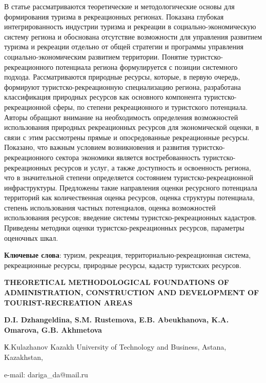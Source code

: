 В статье рассматриваются теоретические и методологические основы для
формирования туризма в рекреационных регионах. Показана глубокая
интегрированность индустрии туризма и рекреации в
социально-экономическую систему региона и обоснована отсутствие
возможности для управления развитием туризма и рекреации отдельно от
общей стратегии и программы управления социально-экономическим развитием
территории. Понятие туристско-рекреационного потенциала региона
формулируется с позиции системного подхода. Рассматриваются природные
ресурсы, которые, в первую очередь, формируют туристско-рекреационную
специализацию региона, разработана классификация природных ресурсов как
основного компонента туристско-рекреационной сферы, по степени
рекреационного и туристского потенциала. Авторы обращают внимание на
необходимость определения возможностей использования природных
рекреационных ресурсов для экономической оценки, в связи с этим
рассмотрены прямые и опосредованные рекреационные ресурсы. Показано, что
важным условием возникновения и развития туристско-рекреационного
сектора экономики является востребованность туристско-рекреационных
ресурсов и услуг, а также доступность и освоенность региона, что в
значительной степени определяется состоянием туристско-рекреационной
инфраструктуры. Предложены такие направления оценки ресурсного
потенциала территорий как количественная оценка ресурсов, оценка
структуры потенциала, степень использования частных потенциалов, оценка
возможностей использования ресурсов; введение системы
туристско-рекреационных кадастров. Приведены методики оценки
туристско-рекреационных ресурсов, параметры оценочных шкал.

{\bfseries Ключевые слова}: туризм, рекреация, территориально-рекреационная
система, рекреационные ресурсы, природные ресурсы, кадастр туристских
ресурсов.

{\bfseries THEORETICAL METHODOLOGICAL FOUNDATIONS OF ADMINISTRATION,
CONSTRUCTION AND DEVELOPMENT OF TOURIST-RECREATION AREAS}

{\bfseries D.I. Dzhangeldina, S.M. Rustemova, E.B. Abeukhanova, K.A.
Omarova, G.B. Akhmetova}

К.Kulazhanov Kazakh University of Technology and Business, Astana,
Kazakhstan,

e-mail: dariga\_da@mail.ru

